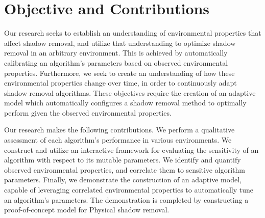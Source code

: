 

\FloatBarrier
\section{Objective and Contributions}

Our research seeks to establish an understanding of environmental properties that affect shadow removal, and utilize that understanding to optimize shadow removal in an arbitrary environment. This is achieved by automatically calibrating an algorithm's parameters based on observed environmental properties. Furthermore, we seek to create an understanding of how these environmental properties change over time, in order to continuously adapt shadow removal algorithms. These objectives require the creation of an adaptive model which automatically configures a shadow removal method to optimally perform given the observed environmental properties.

Our research makes the following contributions. We perform a qualitative assessment of each algorithm's performance in various environments. We construct and utilize an interactive framework for evaluating the sensitivity of an algorithm with respect to its mutable parameters. We identify and quantify observed environmental properties, and correlate them to sensitive algorithm parameters. Finally, we demonstrate the construction of an adaptive model, capable of leveraging correlated environmental properties to automatically tune an algorithm's parameters. The demonstration is completed by constructing a proof-of-concept model for Physical shadow removal.

